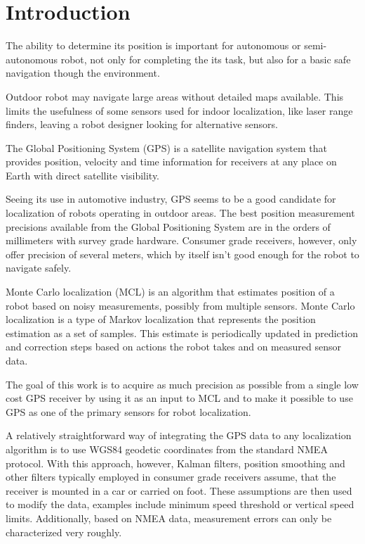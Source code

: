 \chapter{Introduction}


The ability to determine its position is important for autonomous or semi-autonomous robot,
not only for completing the its task, but also for a basic
safe navigation though the environment.

Outdoor robot may navigate large areas without detailed maps available.
This limits
the usefulness of some sensors used for indoor localization, like laser range finders,
leaving a robot designer looking for alternative sensors.

The Global Positioning System (GPS) is a satellite navigation system that
provides position, velocity and time information for receivers at any place on Earth with direct
satellite visibility.

Seeing its use in automotive industry, GPS seems to be a good candidate for
localization of robots operating in outdoor areas.
The best position measurement precisions available from the Global Positioning System
are in the orders of millimeters with survey grade hardware.
Consumer grade receivers, however, only offer precision of several meters, which
by itself isn't good enough for the robot to navigate safely.


Monte Carlo localization (MCL) is an algorithm that estimates position of a robot
based on noisy measurements, possibly from multiple sensors.
Monte Carlo localization is a type of Markov localization that represents the position estimation as
a set of samples.
This estimate is periodically updated in prediction and correction steps based on
actions the robot takes and on measured sensor data.


\vspace{1.5em}

The goal of this work is to acquire as much precision as possible from a single low cost
GPS receiver by using it as an input to MCL and to make it possible to use
GPS as one of the primary sensors for robot localization.

A relatively straightforward way of integrating the GPS data to any localization algorithm is
to use WGS84 geodetic coordinates from the standard NMEA protocol.
With this approach, however, Kalman filters, position smoothing and other filters typically
employed in  consumer grade receivers assume, that the receiver is mounted in a car or carried on foot.
These assumptions are then used to modify the data, examples
include minimum speed threshold or vertical speed limits.
Additionally, based on NMEA data, measurement errors can only be characterized very roughly.

